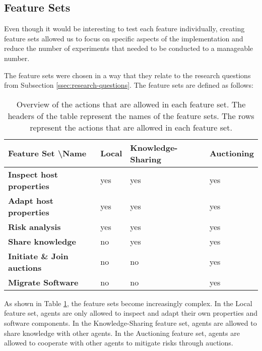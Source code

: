 \subsection{Feature Sets}
Even though it would be interesting to test each feature individually, creating feature sets allowed us to focus on specific aspects of the implementation and reduce the number of experiments that needed to be conducted to a manageable number. 

The feature sets were chosen in a way that they relate to the research questions from Subsection \ref{ssec:research-questions}. The feature sets are defined as follows:

\begin{table}[H]
        \centering
        \begin{tabular}{l|l|l|l}
            \textbf{Feature Set \textbackslash Name} & \textbf{Local} & \textbf{Knowledge-Sharing} & \textbf{Auctioning} \\ \hline
            \textbf{Inspect host properties}     & yes            & yes                        & yes                 \\
            \textbf{Adapt host properties}       & yes            & yes                        & yes                 \\
            \textbf{Risk analysis}               & yes            & yes                        & yes                 \\
            \textbf{Share knowledge}             & no             & yes                        & yes                 \\
            \textbf{Initiate \& Join auctions}   & no             & no                         & yes                 \\
            \textbf{Migrate Software}            & no             & no                         & yes                            
        \end{tabular}
        \caption{\label{table:experiment-features}Overview of the actions that are allowed in each feature set. The headers of the table represent the names of the feature sets. The rows represent the actions that are allowed in each feature set.}
\end{table}

As shown in Table \ref{table:experiment-features}, the feature sets become increasingly complex. In the Local feature set, agents are only allowed to inspect and adapt their own properties and software components. In the Knowledge-Sharing feature set, agents are allowed to share knowledge with other agents. In the Auctioning feature set, agents are allowed to cooperate with other agents to mitigate risks through auctions.

